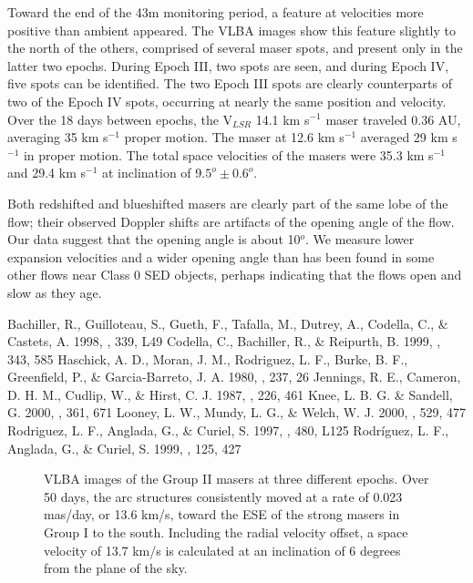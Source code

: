 	Toward the end of the 43m monitoring period, a feature at velocities more positive than ambient appeared.  The VLBA images show this feature slightly to the north of the others, comprised of several maser spots, and present only in the latter two epochs.  During Epoch III, two spots are seen, and during Epoch IV, five spots can be identified.  The two Epoch III spots are clearly counterparts of two of the Epoch IV spots, occurring at nearly the same position and velocity.  Over the 18 days between epochs, the V$_{LSR}$ 14.1 km s$^{-1}$ maser traveled 0.36 AU, averaging 35 km s$^{-1}$ proper motion.  The maser at 12.6 km s$^{-1}$  averaged 29 km s$^{-1}$ in proper motion.  The total space velocities of the masers were 35.3 km s$^{-1}$ and 29.4 km s$^{-1}$  at inclination of $9.5^o \pm 0.6^o$.

	Both redshifted and blueshifted masers are clearly part of the same lobe of the flow; their observed Doppler shifts are artifacts of the opening angle of the flow.  Our data suggest that the opening angle is about 10$^o$.  We measure lower expansion velocities and a wider opening angle than has been found in some other flows near Class 0 SED objects, perhaps indicating that the flows open and slow as they age.

\begin{references}
 Bachiller, R., 
Guilloteau, S., Gueth, F., Tafalla, M., Dutrey, A., Codella, C., \& 
Castets, A. 1998, \aap, 339, L49 
 Codella, C., Bachiller, R., \& Reipurth, B. 1999, \aap, 343, 585 
 Haschick, A. D., 
Moran, J. M., Rodriguez, L. F., Burke, B. F., Greenfield, P., \& 
Garcia-Barreto, J. A. 1980, \apj, 237, 26 
Jennings, R. E., Cameron, D. H. M., Cudlip, W., \& Hirst, C. J. 1987, 
\mnras, 226, 461 
  Knee, L. B. G. \& 
Sandell, G. 2000, \aap, 361, 671 
  Looney, L. 
W., Mundy, L. G., \& Welch, W. J. 2000, \apj, 529, 477 
 Rodriguez, L. F., Anglada, G., \& Curiel, S. 1997, \apjl, 480, L125
Rodr{\'i}guez, L. F., Anglada, G., \& Curiel, S. 1999, \apjs, 125, 427 
\end{references}

\begin{figure}

\vspace{1.0in}
\caption{VLBA images of the Group II masers at three different epochs.  Over 50 days, the arc structures consistently  moved at a rate of  0.023 mas/day, or 13.6 km/s, toward the ESE of the strong masers in Group I to the south.
Including the radial velocity offset, a space velocity of 13.7 km/s is calculated at an inclination of 6 degrees from the plane of the sky.}

\end{figure}


